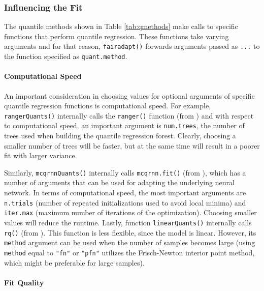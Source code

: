\documentclass[
  nojss]{jss}
\begin{document}
\hypertarget{influencing-the-fit}{%
\subsubsection{Influencing the Fit}\label{influencing-the-fit}}

The quantile methods shown in Table \ref{tab:qmethods} make calls to
specific functions that perform quantile regression. These functions
take varying arguments and for that reason, \texttt{fairadapt()}
forwards arguments passed as \texttt{...} to the function specified as
\texttt{quant.method}.

\hypertarget{computational-speed}{%
\paragraph{Computational Speed}\label{computational-speed}}

An important consideration in choosing values for optional arguments of
specific quantile regression functions is computational speed. For
example, \texttt{rangerQuants()} internally calls the \texttt{ranger()}
function (from ) and with respect to computational speed, an
important argument is \texttt{num.trees}, the number of trees used when
building the quantile regression forest. Clearly, choosing a smaller
number of trees will be faster, but at the same time will result in a
poorer fit with larger variance.

Similarly, \texttt{mcqrnnQuants()} internally calls
\texttt{mcqrnn.fit()} (from ), which has a number of arguments
that can be used for adapting the underlying neural network. In terms of
computational speed, the most important arguments are \texttt{n.trials}
(number of repeated initializations used to avoid local minima) and
\texttt{iter.max} (maximum number of iterations of the optimization).
Choosing smaller values will reduce the runtime. Lastly, function
\texttt{linearQuants()} internally calls \texttt{rq()} (from
). This function is less flexible, since the model is
linear. However, its \texttt{method} argument can be used when the
number of samples becomes large (using \texttt{method} equal to
\texttt{"fn"} or \texttt{"pfn"} utilizes the Frisch-Newton interior
point method, which might be preferable for large samples).

\hypertarget{fit-quality}{%
\paragraph{Fit Quality}\label{fit-quality}}
\end{document}
